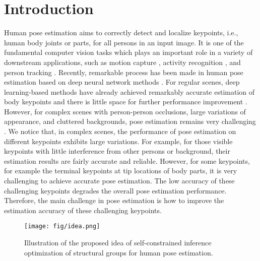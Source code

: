 \documentclass[runningheads]{llncs}
\begin{document}
\section{Introduction}
\label{sec:intro}
Human pose estimation aims to correctly detect and localize keypoints, i.e., human body joints or parts, for all persons in an input image. It is one of the fundamental computer vision tasks which plays an important role  in a variety of downstream applications, such as motion capture \cite{DBLP:conf/cvpr/ElhayekAJTPABST15,DBLP:conf/cvpr/RhodinCKSF19}, activity recognition \cite{DBLP:conf/cvpr/BagautdinovAFFS17,DBLP:conf/cvpr/WuWWGW19}, and person tracking \cite{DBLP:conf/cvpr/YangRLZW021,DBLP:conf/cvpr/WangTM20}. Recently, remarkable process has been made in human pose estimation based on deep neural network methods \cite{DBLP:conf/cvpr/CaoSWS17,Chen_2018_CVPR,DBLP:conf/cvpr/0009XLW19,He_2017_ICCV,DBLP:conf/cvpr/PapandreouZKTTB17,DBLP:conf/cvpr/SuYXGW19}. For regular scenes, deep learning-based methods have already achieved remarkably accurate estimation of body keypoints and there is little space for further performance improvement \cite{DBLP:conf/cvpr/ZhangZD0Z20,DBLP:conf/eccv/WangLGDW20,DBLP:conf/cvpr/0005ZGH20}. However,  for complex scenes with person-person occlusions, large variations of appearance, and cluttered backgrounds, pose estimation remains very challenging \cite{DBLP:conf/eccv/XiaoWW18,DBLP:conf/cvpr/0005ZGH20}. 
We  notice that, in complex scenes, the performance of pose estimation on different keypoints exhibits large variations. For example, for those visible keypoints with little interference from other persons or background, their estimation results are fairly accurate and reliable. However, for some keypoints, for example the terminal keypoints at tip locations of body parts, it is very challenging to achieve accurate pose estimation. The low accuracy of these challenging keypoints degrades the overall pose estimation performance. Therefore, the main challenge in pose estimation is how to improve the estimation accuracy of these challenging keypoints. 


\begin{figure}[t]
\centering
\setlength{\belowcaptionskip}{-0.4cm} 
\texttt{[image: fig/idea.png]}
\centering
\caption{Illustration of the proposed idea of self-constrained inference optimization of structural groups for human pose estimation.}
\label{fig:idea}
\end{figure}
\end{document}
